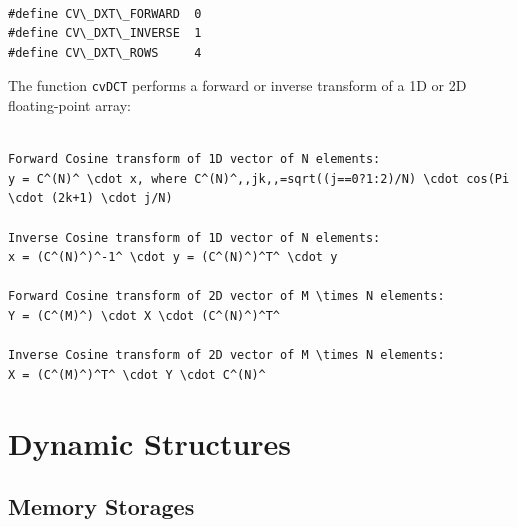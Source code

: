 \begin{lstlisting}

#define CV\_DXT\_FORWARD  0
#define CV\_DXT\_INVERSE  1
#define CV\_DXT\_ROWS     4

\end{lstlisting}

\begin{description}
\end{description}

The function \texttt{cvDCT} performs a forward or inverse transform of a 1D or 2D floating-point array:

\begin{lstlisting}

Forward Cosine transform of 1D vector of N elements:
y = C^(N)^ \cdot x, where C^(N)^,,jk,,=sqrt((j==0?1:2)/N) \cdot cos(Pi \cdot (2k+1) \cdot j/N)

Inverse Cosine transform of 1D vector of N elements:
x = (C^(N)^)^-1^ \cdot y = (C^(N)^)^T^ \cdot y

Forward Cosine transform of 2D vector of M \times N elements:
Y = (C^(M)^) \cdot X \cdot (C^(N)^)^T^

Inverse Cosine transform of 2D vector of M \times N elements:
X = (C^(M)^)^T^ \cdot Y \cdot C^(N)^

\end{lstlisting}


\section{Dynamic Structures}

\subsection{Memory Storages}

